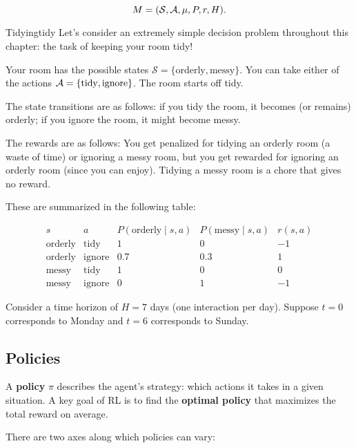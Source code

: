 \documentclass[../main/main]{subfiles}
\begin{document}
\[
    M = (\mathcal{S}, \mathcal{A}, \mu, P, r, H).
\]

\begin{example}{Tidying}{tidy}
    Let's consider an extremely simple decision problem throughout this chapter: the task of keeping your room tidy!

    Your room has the possible states $\mathcal{S} = \{ \text{orderly}, \text{messy} \}$. You can take either of the actions $\mathcal{A} = \{ \text{tidy}, \text{ignore} \}$. The room starts off tidy.
    
    The state transitions are as follows: if you tidy the room, it becomes (or remains) orderly; if you ignore the room, it might become messy.
    
    The rewards are as follows: You get penalized for tidying an orderly room (a waste of time) or ignoring a messy room, but you get rewarded for ignoring an orderly room (since you can enjoy). Tidying a messy room is a chore that gives no reward.
    
    These are summarized in the following table:

    \[
    \begin{array}{ccccc}
        s & a & P(\text{orderly} \mid s, a) & P(\text{messy} \mid s, a) & r(s, a) \\
        \text{orderly} & \text{tidy} & 1 & 0 & -1 \\
        \text{orderly} & \text{ignore} & 0.7 & 0.3 & 1 \\
        \text{messy} & \text{tidy} & 1 & 0 & 0 \\
        \text{messy} & \text{ignore} & 0 & 1 & -1
    \end{array}
    \]

    Consider a time horizon of $H = 7$ days (one interaction per day). Suppose $t = 0$ corresponds to Monday and $t = 6$ corresponds to Sunday.
\end{example}

\subsection{Policies}

A \textbf{policy} $\pi$ describes the agent's strategy: which actions it takes in a given situation. A key goal of RL is to find the \textbf{optimal policy} that maximizes the total reward on average.

There are two axes along which policies can vary:
\end{document}
